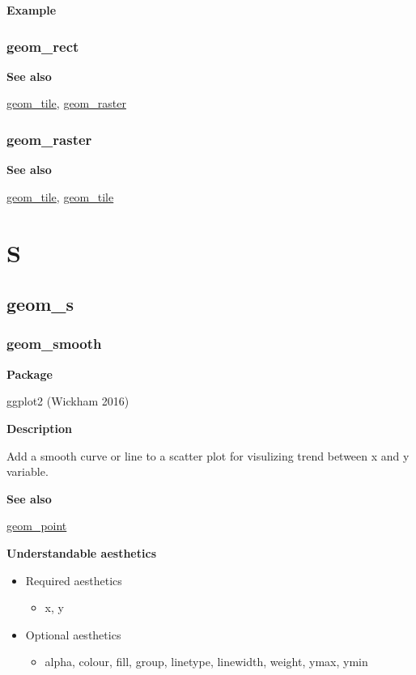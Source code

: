 \documentclass[
  letterpaper,
  DIV=11,
  numbers=noendperiod]{scrreprt}
\providecommand{\tightlist}{%
  \setlength{\itemsep}{0pt}\setlength{\parskip}{0pt}}\usepackage{longtable,booktabs,array}
\begin{document}
\textbf{Example}

\section{geom\_rect}\label{geom_rect-1}

\textbf{See also}

\hyperref[tile]{geom\_tile}, \hyperref[raster]{geom\_raster}

\section{geom\_raster}\label{geom_raster}

\textbf{See also}

\hyperref[rect]{geom\_tile}, \hyperref[tile]{geom\_tile}

\part{S}

\chapter{geom\_s}\label{sec-s}

\section{geom\_smooth}\label{geom_smooth}

\textbf{Package}

ggplot2 (Wickham 2016)

\textbf{Description}

Add a smooth curve or line to a scatter plot for visulizing trend
between x and y variable.

\textbf{See also}

\hyperref[point]{geom\_point}

\textbf{Understandable aesthetics}

\begin{itemize}
\tightlist
\item
  Required aesthetics

  \begin{itemize}
  \tightlist
  \item
    x, y
  \end{itemize}
\item
  Optional aesthetics

  \begin{itemize}
  \tightlist
  \item
    alpha, colour, fill, group, linetype, linewidth, weight, ymax, ymin
  \end{itemize}
\end{itemize}
\end{document}
